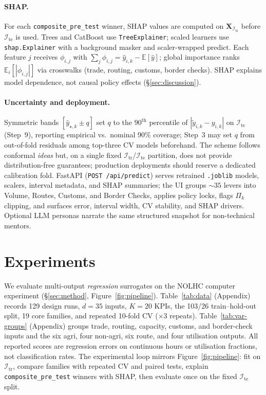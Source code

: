 \documentclass[10pt,twocolumn]{article}
\newcommand{\train}{\mathcal{I}_{\mathrm{tr}}}
\newcommand{\test}{\mathcal{I}_{\mathrm{te}}}
\begin{document}
\paragraph{SHAP.}
For each \texttt{composite\_pre\_test} winner, SHAP values \citep{lundberg2017shap} are computed on $\mathbf{X}_{\train}$ before $\test$ is used.
Trees and CatBoost use \texttt{TreeExplainer}; scaled learners use \texttt{shap.Explainer} with a background masker and scaler-wrapped predict.
Each feature $j$ receives $\phi_{i,j}$ with $\sum_j \phi_{i,j} = \hat{y}_{i,k} - \mathbb{E}[\hat{y}]$; global importance ranks $\mathbb{E}_i[|\phi_{i,j}|]$ via crosswalks (trade, routing, customs, border checks).
SHAP explains model dependence, not causal policy effects (\S\ref{sec:discussion}).

\paragraph{Uncertainty and deployment.}
\label{sec:method-deploy}
Symmetric bands $[\hat{y}_{\star,k} \pm q]$ set $q$ to the $90^{\mathrm{th}}$ percentile of $|\tilde{y}_{i,k}-y_{i,k}|$ on $\test$ (Step~9), reporting empirical vs.\ nominal 90\% coverage; Step~3 may set $q$ from out-of-fold residuals among top-three CV models beforehand.
The scheme follows conformal \emph{ideas} \citep{vovk2005algorithmic,angelopoulos2023conformal,romano2019cqr} but, on a single fixed $\train$/$\test$ partition, does not provide distribution-free guarantees; production deployments should reserve a dedicated calibration fold.
FastAPI (\texttt{POST /api/predict}) serves retrained \texttt{.joblib} models, scalers, interval metadata, and SHAP summaries; the UI groups ${\sim}35$ levers into Volume, Routes, Customs, and Border Checks, applies policy locks, flags $\Pi_k$ clipping, and surfaces error, interval width, CV stability, and SHAP drivers.
Optional LLM personas narrate the same structured snapshot for non-technical mentors.

\section{Experiments}
\label{sec:experiments}

We evaluate multi-output \emph{regression} surrogates on the NOLHC computer experiment (\S\ref{sec:method}, Figure~\ref{fig:pipeline}).
Table~\ref{tab:data} (Appendix) records 129 design runs, $d{=}35$ inputs, $K{=}20$ KPIs, the 103/26 train--hold-out split, 19 core families, and repeated 10-fold CV ($\times 3$ repeats).
Table~\ref{tab:var-groups} (Appendix) groups trade, routing, capacity, customs, and border-check inputs and the six agri, four non-agri, six route, and four utilisation outputs.
All reported scores are regression errors on continuous hours or utilisation fractions, not classification rates.
The experimental loop mirrors Figure~\ref{fig:pipeline}: fit on $\train$, compare families with repeated CV and paired tests, explain \texttt{composite\_pre\_test} winners with SHAP, then evaluate once on the fixed $\test$ split.
\end{document}
